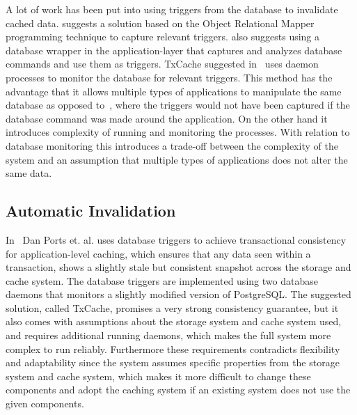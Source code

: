 A lot of work has been put into using triggers from the database to invalidate cached data. \cite{paper:cache-genie} suggests a solution based on the Object Relational Mapper programming technique to capture relevant triggers. \cite{paper:deploy-time} also suggests using a database wrapper in the application-layer that captures and analyzes database commands and use them as triggers. TxCache suggested in~\cite{paper:liskov} uses daemon processes to monitor the database for relevant triggers. This method has the advantage that it allows multiple types of applications to manipulate the same database as opposed to~\cite{paper:cache-genie, paper:deploy-time}, where the triggers would not have been captured if the database command was made around the application. On the other hand it introduces complexity of running and monitoring the processes. With relation to database monitoring this introduces a trade-off between the complexity of the system and an assumption that multiple types of applications does not alter the same data.


\subsection{Automatic Invalidation}
\label{subsec:automatic_invalidation}

In~\cite{paper:liskov} Dan Ports et. al. uses database triggers to achieve transactional consistency for application-level caching, which ensures that any data seen within a transaction, shows a slightly stale but consistent snapshot across the storage and cache system. The database triggers are implemented using two database daemons that monitors a slightly modified version of PostgreSQL. The suggested solution, called TxCache, promises a very strong consistency guarantee, but it also comes with assumptions about the storage system and cache system used, and requires additional running daemons, which makes the full system more complex to run reliably. Furthermore these requirements contradicts flexibility and adaptability since the system assumes specific properties from the storage system and cache system, which makes it more difficult to change these components and adopt the caching system if an existing system does not use the given components.

